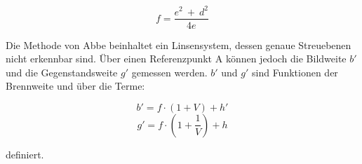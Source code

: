 \begin{equation}
    f = \frac{e^2\ +\ d^2}{4e}
    \label{eq:bessel}
\end{equation}

Die Methode von Abbe beinhaltet ein Linsensystem, dessen genaue Streuebenen nicht erkennbar sind.
Über einen Referenzpunkt A können jedoch die Bildweite $b'$ und die Gegenstandsweite $g'$ gemessen werden.
$b'$ und $g'$ sind Funktionen der Brennweite und über die Terme:

\begin{equation}
    b' = f\cdot(1+V)+h'
    \label{eq:abbe}
\end{equation}
\begin{equation*}
    g' = f\cdot(1+\frac{1}{V})+h
\end{equation*}

definiert.